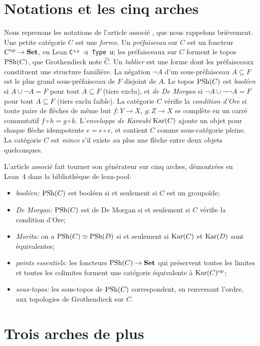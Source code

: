 \section{Notations et les cinq arches}\label{sec:recall}

Nous reprenons les notations de l'article associé \cite{bridges-generator}, que nous rappelons brièvement. Une petite catégorie $C$ est une \emph{forme}. Un \emph{préfaisceau} sur $C$ est un foncteur $C^{\mathrm{op}}\to\mathbf{Set}$, en Lean \texttt{Cᵒᵖ ⥤ Type u}; les préfaisceaux sur $C$ forment le topos $\mathrm{PSh}(C)$, que Grothendieck note $\widehat C$. Un \emph{tablier} est une forme dont les préfaisceaux constituent une structure familière. La négation $\neg A$ d'un sous-préfaisceau $A\subseteq F$ est le plus grand sous-préfaisceau de $F$ disjoint de $A$. Le topos $\mathrm{PSh}(C)$ est \emph{booléen} si $A\cup\neg A = F$ pour tout $A\subseteq F$ (tiers exclu), et \emph{de De Morgan} si $\neg A\cup\neg\neg A = F$ pour tout $A\subseteq F$ (tiers exclu faible). La catégorie $C$ vérifie la \emph{condition d'Ore} si toute paire de flèches de même but $f : Y\to X$, $g : Z\to X$ se complète en un carré commutatif $f\circ h = g\circ k$. L'\emph{enveloppe de Karoubi} $\operatorname{Kar}(C)$ ajoute un objet pour chaque flèche idempotente $e = e\circ e$, et contient $C$ comme sous-catégorie pleine. La catégorie $C$ est \emph{mince} s'il existe au plus une flèche entre deux objets quelconques.

L'article associé fait tourner son générateur sur cinq arches, démontrées en Lean~4 dans la bibliothèque \lp{} de lean-pool:
\begin{itemize}
\item \emph{booléen:} $\mathrm{PSh}(C)$ est booléen si et seulement si $C$ est un groupoïde;
\item \emph{De Morgan:} $\mathrm{PSh}(C)$ est de De Morgan si et seulement si $C$ vérifie la condition d'Ore;
\item \emph{Morita:} on a $\mathrm{PSh}(C)\simeq\mathrm{PSh}(D)$ si et seulement si $\operatorname{Kar}(C)$ et $\operatorname{Kar}(D)$ sont équivalentes;
\item \emph{points essentiels:} les foncteurs $\mathrm{PSh}(C)\to\mathbf{Set}$ qui préservent toutes les limites et toutes les colimites forment une catégorie équivalente à $\operatorname{Kar}(C)^{\mathrm{op}}$;
\item \emph{sous-topos:} les sous-topos de $\mathrm{PSh}(C)$ correspondent, en renversant l'ordre, aux topologies de Grothendieck sur $C$.
\end{itemize}

\section{Trois arches de plus}\label{sec:morearches}

